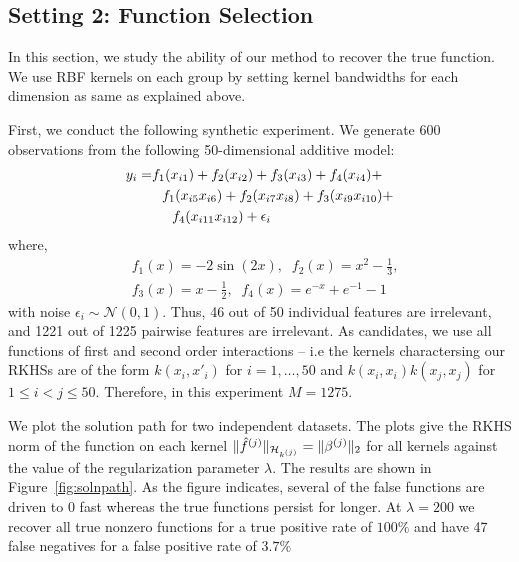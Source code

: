 \subsection{Setting 2: Function Selection}

In this section, we study the ability of our method to recover the true function.
We use RBF kernels on each group by setting kernel bandwidths
for each dimension as same as explained above.

First, we conduct the following synthetic experiment.
We generate $600$ observations from the following
50-dimensional additive model:
\begingroup
\allowdisplaybreaks
\begin{align*}
	y_i =& f_1(x_{i1}) + f_2(x_{i2}) + f_3(x_{i3}) + f_4(x_{i4}) + 
\\ &\hspace{0.1in}
f_1(x_{i5}x_{i6}) + f_2(x_{i7}x_{i8}) + 
f_3(x_{i9}x_{i10}) + \\
  &\hspace{0.2in}f_4(x_{i11}x_{i12}) + \epsilon_i 
\end{align*}
\endgroup
where,
\begin{align*}
&f_1(x) = -2\sin(2x), \;\; f_2(x) = x^2 - \frac{1}{3}, \\
&f_3(x)= x-\frac{1}{2},\;\; f_4(x) = e^{-x} + e^{-1} - 1
\end{align*}
with noise $\epsilon_i \sim \mathcal{N}(0,1)$.
Thus, 46 out of 50 individual features are irrelevant, and
1221 out of 1225 pairwise features are irrelevant.
As candidates, we use all functions of first and second order interactions --
i.e the kernels charactersing our RKHSs are of the form
$k(x_i, x'_i)$ for $i=1,\dots,50$ and $k(x_i,x_i)k(x_j,x_j)$ for
$1\leq i < j \leq 50$. Therefore, in this experiment $M = 1275$.

We plot the solution path for two independent datasets. The plots give the RKHS
norm of the function on each kernel $\|\hat{f}^{(j)}\|_{{{\mathcal{H}_{k^{(j)}}}}} = \|{\beta^{(j)}}\|_2$
for all kernels against the value of the regularization parameter $\lambda$.
The results are shown in Figure~\ref{fig:solnpath}. 
As the figure indicates, several of the false functions are driven to $0$ fast
whereas the true functions persist for longer.
At $\lambda=200$ we recover all true nonzero functions for a true positive rate
of $100\%$ and have 47 false negatives for a false positive rate of $3.7\%$


